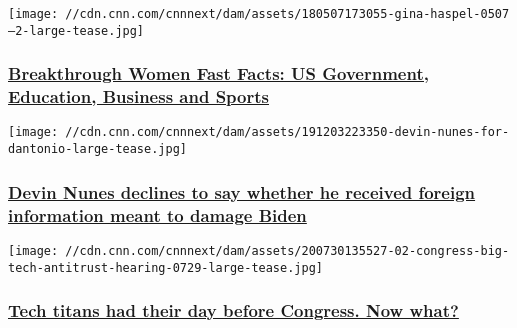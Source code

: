 \href{/2017/01/17/us/breakthrough-women-fast-facts-us-government-education-and-business/index.html}{}

\texttt{[image: //cdn.cnn.com/cnnnext/dam/assets/180507173055-gina-haspel-0507---2-large-tease.jpg]}

\hypertarget{breakthrough-women-fast-facts-us-government-education-business-and-sports}{%
\subsubsection{\texorpdfstring{\href{/2017/01/17/us/breakthrough-women-fast-facts-us-government-education-and-business/index.html}{Breakthrough
Women Fast Facts: US Government, Education, Business and
Sports}}{Breakthrough Women Fast Facts: US Government, Education, Business and Sports}}\label{breakthrough-women-fast-facts-us-government-education-business-and-sports}}

\href{/2020/07/30/politics/nunes-declines-answer-foreign-information-damage-biden/index.html}{}

\texttt{[image: //cdn.cnn.com/cnnnext/dam/assets/191203223350-devin-nunes-for-dantonio-large-tease.jpg]}

\hypertarget{devin-nunes-declines-to-say-whether-he-received-foreign-information-meant-to-damage-biden}{%
\subsubsection{\texorpdfstring{\href{/2020/07/30/politics/nunes-declines-answer-foreign-information-damage-biden/index.html}{Devin
Nunes declines to say whether he received foreign information meant to
damage
Biden}}{Devin Nunes declines to say whether he received foreign information meant to damage Biden}}\label{devin-nunes-declines-to-say-whether-he-received-foreign-information-meant-to-damage-biden}}

\href{/2020/07/31/tech/tech-antitrust-hearing-analysis/index.html}{}

\texttt{[image: //cdn.cnn.com/cnnnext/dam/assets/200730135527-02-congress-big-tech-antitrust-hearing-0729-large-tease.jpg]}

\hypertarget{tech-titans-had-their-day-before-congress-now-what}{%
\subsubsection{\texorpdfstring{\href{/2020/07/31/tech/tech-antitrust-hearing-analysis/index.html}{Tech
titans had their day before Congress. Now
what?}}{Tech titans had their day before Congress. Now what?}}\label{tech-titans-had-their-day-before-congress-now-what}}

